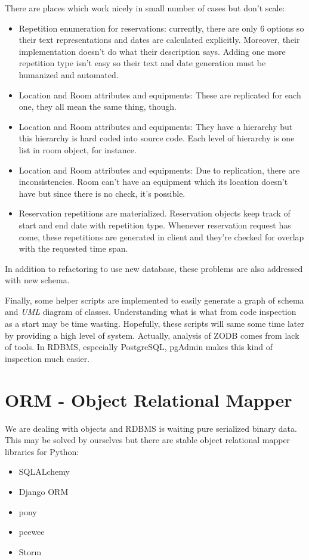 There are places which work nicely in small number of cases but don't scale:
\begin{itemize}
  \item Repetition enumeration for reservations: currently, there are only 6 options so their text representations and dates are calculated explicitly. Moreover, their implementation doesn't do what their description says. Adding one more repetition type isn't easy so their text and date generation must be humanized and automated.
  \item Location and Room attributes and equipments: These are replicated for each one, they all mean the same thing, though.
  \item Location and Room attributes and equipments: They have a hierarchy but this hierarchy is hard coded into source code. Each level of hierarchy is one list in room object, for instance.
  \item Location and Room attributes and equipments: Due to replication, there are inconsistencies. Room can't have an equipment which its location doesn't have but since there is no check, it's possible.
  \item Reservation repetitions are materialized. Reservation objects keep track of start and end date with repetition type. Whenever reservation request has come, these repetitions are generated in client and they're checked for overlap with the requested time span.
\end{itemize}

In addition to refactoring to use new database, these problems are also addressed with new schema.

Finally, some helper scripts are implemented to easily generate a graph of schema and \textit{UML} diagram of classes. Understanding what is what from code inspection as a start may be time wasting. Hopefully, these scripts will same some time later by providing a high level of system. Actually, analysis of ZODB comes from lack of tools. In RDBMS, especially PostgreSQL, pgAdmin makes this kind of inspection much easier.

\section{ORM - Object Relational Mapper}

We are dealing with objects and RDBMS is waiting pure serialized binary data. This may be solved by ourselves but there are stable object relational mapper libraries for Python:
\begin{itemize}
  \item SQLALchemy
  \item Django ORM
  \item pony
  \item peewee
  \item Storm
\end{itemize}


